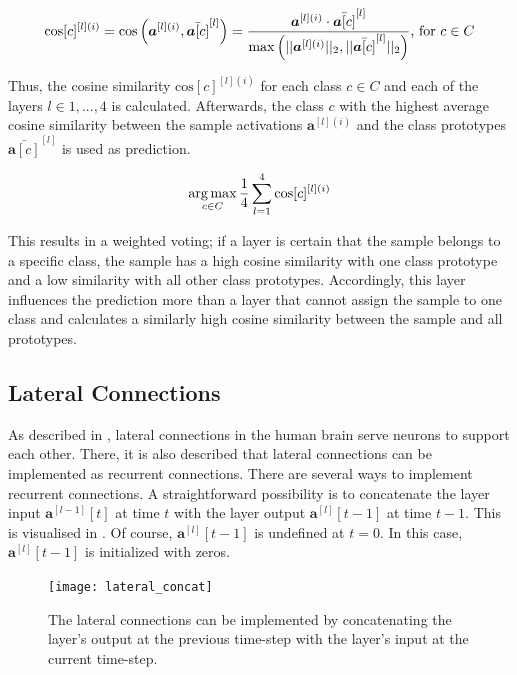 \begin{equation}\eqlbl{vso_11}
		\text{cos}[c]^{[l](i)} = \text{cos} \left( \boldsymbol{a}^{[l](i)}, \bar{\boldsymbol{a}[c]}^{[l]} \right) = \frac{\boldsymbol{a}^{[l](i)} \cdot \bar{\boldsymbol{a}[c]}^{[l]}}{\max \left( ||\boldsymbol{a}^{[l](i)}||_2, ||\bar{\boldsymbol{a}[c]}^{[l]}||_2 \right)} \text{, for } c \in C
\end{equation}

Thus, the cosine similarity $\text{cos}[c]^{[l](i)}$ for each class $c \in C$ and each of the layers $l \in {1, ..., 4}$ is calculated. Afterwards, the class $c$ with the highest average cosine similarity between the sample activations $\boldsymbol{a}^{[l](i)}$ and the class prototypes $\bar{\boldsymbol{a}[c]}^{[l]} 
$ is used as prediction.

\begin{equation}\eqlbl{vso_12}
		\argmax_{c \in C} \frac{1}{4} \sum_{l=1}^{4} \text{cos}[c]^{[l](i)}
\end{equation}

This results in a weighted voting; if a layer is certain that the sample belongs to a specific class, the sample has a high cosine similarity with one class prototype and a low similarity with all other class prototypes. Accordingly, this layer influences the prediction more than a layer that cannot assign the sample to one class and calculates a similarly high cosine similarity between the sample and all prototypes.

\subsection{Lateral Connections}
As described in , lateral connections in the human brain serve neurons to support each other.
There, it is also described that lateral connections can be implemented as recurrent connections.
There are several ways to implement recurrent connections. A straightforward possibility is to concatenate the layer input $\boldsymbol{a}^{[l-1]}[t]$ at time $t$ with the layer output $\boldsymbol{a}^{[l]}[t-1]$  at time $t-1$. This is visualised in . Of course, $\boldsymbol{a}^{[l]}[t-1]$ is undefined at $t=0$. In this case, $\boldsymbol{a}^{[l]}[t-1]$ is initialized with zeros.

\begin{figure}[h]
    \centering
    \texttt{[image: lateral\_concat]}
    \caption[Lateral connections by concatenating the layer's output with the layer's input]{The lateral connections can be implemented by concatenating the layer's output at the previous time-step with the layer's input at the current time-step.}
\end{figure}


